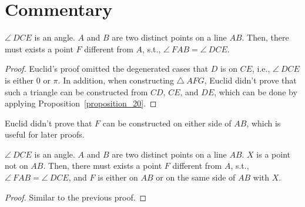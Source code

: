\section*{Commentary}

\begin{proposition}\label{proposition_23}\leanok
    $\angle~DCE$ is an angle. $A$ and $B$ are two distinct points on a line $AB$. Then, there must exists a point $F$ different from $A$, s.t., $\angle~FAB = \angle~DCE$.
\end{proposition}
\begin{proof}
    \leanok
    Euclid's proof omitted the degenerated cases that $D$ is on $CE$, i.e., $\angle~DCE$ is either $0$ or $\pi$.
    In addition, when constructing $\triangle~AFG$, Euclid didn't prove that such a triangle can be constructed from $CD$, $CE$, and $DE$, which can be done by applying Proposition~\ref{proposition_20}.
\end{proof}

Euclid didn't prove that $F$ can be constructed on either side of $AB$, which is useful for later proofs.

\begin{proposition}\label{proposition_23'}\leanok
    $\angle~DCE$ is an angle. $A$ and $B$ are two distinct points on a line $AB$. $X$ is a point not on $AB$. Then, there must exists a point $F$ different from $A$, s.t., $\angle~FAB = \angle~DCE$, and $F$ is either on $AB$ or on the same side of $AB$ with $X$.
\end{proposition}
\begin{proof}
    \leanok
    Similar to the previous proof.
\end{proof}
